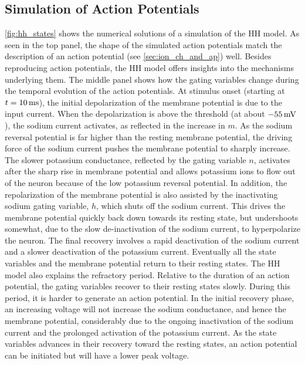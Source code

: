 \subsection{Simulation of Action Potentials}

\autoref{fig:hh_states} shows the numerical solutions of a simulation of the HH model. As seen in the top panel, the shape of the simulated action potentials match the description of an action potential (see \cref{sec:ion_ch_and_ap}) well. Besides reproducing action potentials, the HH model offers insights into the mechanisms underlying them. The middle panel shows how the gating variables change during the temporal evolution of the action potentials. At stimulus onset (starting at $t=10 \,\mathrm{ms}$), the initial depolarization of the membrane potential is due to the input current. When the depolarization is above the threshold (at about $-55 \,\mathrm{mV}$), the sodium current activates, as reflected in the increase in $m$. As the sodium reversal potential is far higher than the resting membrane potential, the driving force of the sodium current pushes the membrane potential to sharply increase. The slower potassium conductance, reflected by the gating variable $n$, activates after the sharp rise in membrane potential and allows potassium ions to flow out of the neuron because of the low potassium reversal potential. In addition, the repolarization of the membrane potential is also assisted by the inactivating sodium gating variable, $h$, which shuts off the sodium current. This drives the membrane potential quickly back down towards its resting state, but undershoots somewhat, due to the slow de-inactivation of the sodium current, to hyperpolarize the neuron. The final recovery involves a rapid deactivation of the sodium current and a slower deactivation of the potassium current. Eventually all the state variables and the membrane potential return to their resting states. The HH model also explains the refractory period. Relative to the duration of an action potential, the gating variables recover to their resting states slowly. During this period, it is harder to generate an action potential. In the initial recovery phase, an increasing voltage will not increase the sodium conductance, and hence the membrane potential, considerably due to the ongoing inactivation of the sodium current and the prolonged activation of the potassium current. As the state variables advances in their recovery toward the resting states, an action potential can be initiated but will have a lower peak voltage. 

